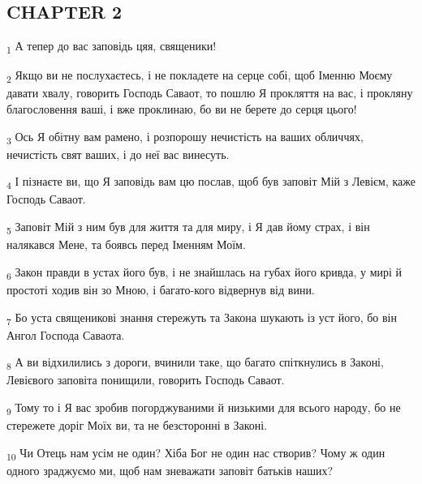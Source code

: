 \subsection{CHAPTER 2}
\begin{tcolorbox}
\textsubscript{1} А тепер до вас заповідь цяя, священики!
\end{tcolorbox}
\begin{tcolorbox}
\textsubscript{2} Якщо ви не послухаєтесь, і не покладете на серце собі, щоб Іменню Моєму давати хвалу, говорить Господь Саваот, то пошлю Я прокляття на вас, і прокляну благословення ваші, і вже проклинаю, бо ви не берете до серця цього!
\end{tcolorbox}
\begin{tcolorbox}
\textsubscript{3} Ось Я обітну вам рамено, і розпорошу нечистість на ваших обличчях, нечистість свят ваших, і до неї вас винесуть.
\end{tcolorbox}
\begin{tcolorbox}
\textsubscript{4} І пізнаєте ви, що Я заповідь вам цю послав, щоб був заповіт Мій з Левієм, каже Господь Саваот.
\end{tcolorbox}
\begin{tcolorbox}
\textsubscript{5} Заповіт Мій з ним був для життя та для миру, і Я дав йому страх, і він налякався Мене, та боявсь перед Іменням Моїм.
\end{tcolorbox}
\begin{tcolorbox}
\textsubscript{6} Закон правди в устах його був, і не знайшлась на губах його кривда, у мирі й простоті ходив він зо Мною, і багато-кого відвернув від вини.
\end{tcolorbox}
\begin{tcolorbox}
\textsubscript{7} Бо уста священикові знання стережуть та Закона шукають із уст його, бо він Ангол Господа Саваота.
\end{tcolorbox}
\begin{tcolorbox}
\textsubscript{8} А ви відхилились з дороги, вчинили таке, що багато спіткнулись в Законі, Левієвого заповіта понищили, говорить Господь Саваот.
\end{tcolorbox}
\begin{tcolorbox}
\textsubscript{9} Тому то і Я вас зробив погорджуваними й низькими для всього народу, бо не стережете доріг Моїх ви, та не безсторонні в Законі.
\end{tcolorbox}
\begin{tcolorbox}
\textsubscript{10} Чи Отець нам усім не один? Хіба Бог не один нас створив? Чому ж один одного зраджуємо ми, щоб нам зневажати заповіт батьків наших?
\end{tcolorbox}
